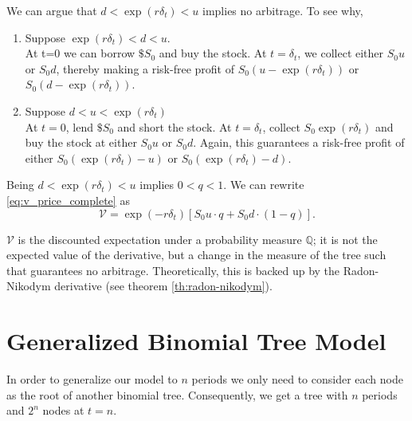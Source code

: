 \documentclass[../TGMAFFIRO.tex]{subfiles}
\begin{document}
We can argue that $d < \exp{(r\delta_t)} < u$ implies no arbitrage. To see why, 
\begin{enumerate}
\item Suppose $\exp{(r\delta_t)} < d < u$.\\
    At t=0 we can borrow $\$S_0$ and buy the stock. At $t=\delta_t$, we collect either $S_0u$ or $S_0d$, thereby making a risk-free profit of $S_0(u - \exp{(r\delta_t)})$ or $S_0(d - \exp{(r\delta_t)})$.

\item Suppose $d < u < \exp{(r\delta_t)}$\\
    At $t=0$, lend $\$S_0$ and short the stock. At $t=\delta_t$, collect $S_0\exp{(r\delta_t)}$ and buy the stock at either $S_0u$ or $S_0d$. Again, this guarantees a risk-free profit of either $S_0(\exp{(r\delta_t)} - u)$ or $S_0(\exp{(r\delta_t)} - d)$.
\end{enumerate}

Being $d < \exp{(r\delta_t)} < u$ implies $0 < q < 1$. We can rewrite \ref{eq:v_price_complete} as
\begin{equation} \label{eq:v_price}
    \mathcal{V} = \exp{(-r\delta_t)}[S_0u\cdot q + S_0d \cdot (1-q)].
\end{equation}


$\mathcal V$ is the discounted expectation under a probability measure $\mathbb Q$; it is not the expected value of the derivative, but a change in the measure of the tree such that guarantees no arbitrage. Theoretically, this is backed up by the Radon-Nikodym derivative (see theorem \ref{th:radon-nikodym}).

\section{Generalized Binomial Tree Model}
In order to generalize our model to $n$ periods we only need to consider each node as the root of another binomial tree. Consequently, we get a tree with $n$ periods and $2^n$ nodes at $t=n$.\\
\end{document}
